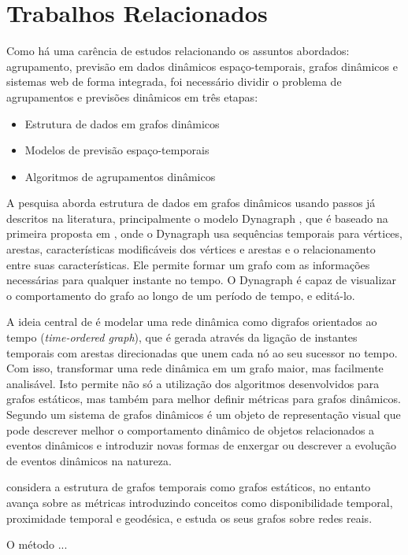 \section{Trabalhos Relacionados}
 \label{chap:trabalhos-relacionados} 
Como há uma carência de estudos relacionando os assuntos abordados: agrupamento,
previsão em dados dinâmicos espaço-temporais, grafos dinâmicos e sistemas web
de forma integrada, foi necessário dividir o problema de agrupamentos e previsões dinâmicos em três etapas:
\begin{itemize}
\item Estrutura de dados em grafos dinâmicos
\item Modelos de previsão espaço-temporais
\item Algoritmos de agrupamentos dinâmicos
\end{itemize}

A pesquisa aborda estrutura de dados em grafos dinâmicos usando passos já descritos na literatura,
principalmente o modelo Dynagraph \cite{dynagraph}, que é baseado na primeira proposta
em \cite{dynagraph2012}, onde o Dynagraph usa sequências temporais para vértices, arestas,
características modificáveis dos vértices e arestas e o relacionamento entre suas características.
Ele permite formar um grafo com as informações necessárias para qualquer instante no tempo.
O Dynagraph é capaz de visualizar o comportamento do grafo ao longo de um período de tempo,
e editá-lo.

A ideia central de \cite{kim} é modelar uma rede dinâmica como digrafos orientados ao
tempo (\textit{time-ordered graph}), que é gerada através da ligação de instantes temporais com arestas
direcionadas que unem cada nó ao seu sucessor no tempo. Com isso, transformar uma rede dinâmica
em um grafo maior, mas facilmente analisável. Isto permite não só a utilização dos algoritmos 
desenvolvidos para grafos estáticos, mas também para melhor definir métricas para grafos dinâmicos.
Segundo \cite{kim} um sistema de grafos dinâmicos é um objeto de representação visual
que pode descrever melhor o comportamento dinâmico de objetos relacionados a eventos dinâmicos e
introduzir novas formas de enxergar ou descrever a evolução de eventos dinâmicos na natureza.

\cite{kostakos} considera a estrutura de grafos temporais como grafos
estáticos, no entanto avança sobre as métricas introduzindo conceitos como disponibilidade
temporal, proximidade temporal e geodésica, e estuda os seus grafos sobre redes reais.

O método ...\cite{ign}
